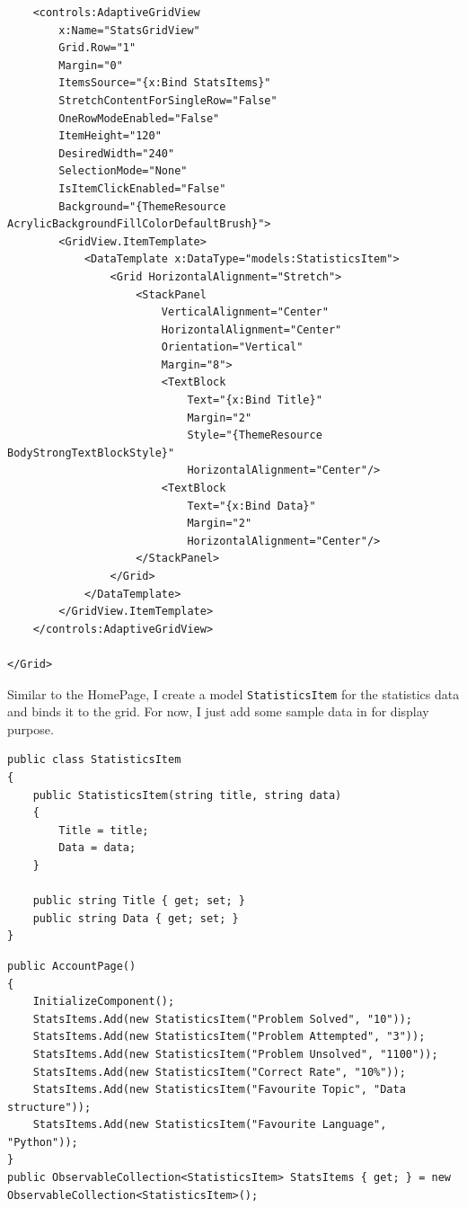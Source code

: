 \documentclass[a4paper]{report}
\begin{document}
\begin{verbatim}
    <controls:AdaptiveGridView
        x:Name="StatsGridView"
        Grid.Row="1"
        Margin="0"
        ItemsSource="{x:Bind StatsItems}"
        StretchContentForSingleRow="False"
        OneRowModeEnabled="False"
        ItemHeight="120"
        DesiredWidth="240"
        SelectionMode="None"
        IsItemClickEnabled="False"
        Background="{ThemeResource AcrylicBackgroundFillColorDefaultBrush}">
        <GridView.ItemTemplate>
            <DataTemplate x:DataType="models:StatisticsItem">
                <Grid HorizontalAlignment="Stretch">
                    <StackPanel 
                        VerticalAlignment="Center"
                        HorizontalAlignment="Center"
                        Orientation="Vertical"
                        Margin="8">
                        <TextBlock
                            Text="{x:Bind Title}"
                            Margin="2"
                            Style="{ThemeResource BodyStrongTextBlockStyle}"
                            HorizontalAlignment="Center"/>
                        <TextBlock 
                            Text="{x:Bind Data}"
                            Margin="2"
                            HorizontalAlignment="Center"/>
                    </StackPanel>
                </Grid>
            </DataTemplate>
        </GridView.ItemTemplate>
    </controls:AdaptiveGridView>

</Grid>
\end{verbatim}

Similar to the HomePage, I create a model \verb|StatisticsItem| for the statistics data and binds it to the grid. For now, I just add some sample data in for display purpose.

\begin{verbatim}
public class StatisticsItem
{
    public StatisticsItem(string title, string data)
    {
        Title = title;
        Data = data;
    }

    public string Title { get; set; }
    public string Data { get; set; }
}
\end{verbatim}

\begin{verbatim}
public AccountPage()
{
    InitializeComponent();
    StatsItems.Add(new StatisticsItem("Problem Solved", "10"));
    StatsItems.Add(new StatisticsItem("Problem Attempted", "3"));
    StatsItems.Add(new StatisticsItem("Problem Unsolved", "1100"));
    StatsItems.Add(new StatisticsItem("Correct Rate", "10%"));
    StatsItems.Add(new StatisticsItem("Favourite Topic", "Data structure"));
    StatsItems.Add(new StatisticsItem("Favourite Language", "Python"));
}
public ObservableCollection<StatisticsItem> StatsItems { get; } = new ObservableCollection<StatisticsItem>();
\end{verbatim}
\end{document}
